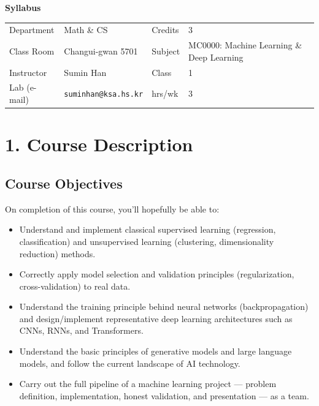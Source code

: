 \documentclass[11pt]{article}
\begin{document}
\begin{center}
{\LARGE \bf Syllabus}
\end{center}

\vspace{4pt}
\noindent
\begin{tabular}{@{}p{2.3cm}p{4.3cm}p{1.7cm}p{5.0cm}@{}}
\toprule
Department & Math \& CS & Credits & 3 \\
Class Room & Changui-gwan 5701 & Subject & MC0000: Machine Learning \&
Deep Learning \\
Instructor & Sumin Han & Class & 1 \\
Lab (e-mail) & \texttt{suminhan@ksa.hs.kr} & hrs/wk & 3 \\
\bottomrule
\end{tabular}

\section*{1. Course Description}

\subsection*{Course Objectives}
On completion of this course, you'll hopefully be able to:
\begin{itemize}[nosep]
\item Understand and implement classical supervised learning (regression,
  classification) and unsupervised learning (clustering, dimensionality
  reduction) methods.
\item Correctly apply model selection and validation principles
  (regularization, cross-validation) to real data.
\item Understand the training principle behind neural networks
  (backpropagation) and design/implement representative deep learning
  architectures such as CNNs, RNNs, and Transformers.
\item Understand the basic principles of generative models and large
  language models, and follow the current landscape of AI technology.
\item Carry out the full pipeline of a machine learning project --- problem
  definition, implementation, honest validation, and presentation --- as a
  team.
\end{itemize}
\end{document}
